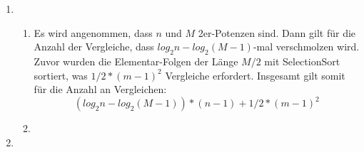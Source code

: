 \documentclass[a4paper,10pt]{scrartcl}
\begin{document}
\begin{enumerate}
\begin{description}
      \end{description}
\item \begin{enumerate}
       \item Es wird angenommen, dass $n$ und $M$ 2er-Potenzen sind.
	     Dann gilt für die Anzahl der Vergleiche, dass $log_2 n - log_2 (M - 1)$-mal verschmolzen wird. Zuvor wurden die Elementar-Folgen der Länge $M/2$ mit SelectionSort sortiert, was $1/2 * (m - 1)^2$ Vergleiche erfordert.
	     Insgesamt gilt somit für die Anzahl an Vergleichen:
	     \[
	      (log_2 n - log_2 (M-1)) * (n - 1) + 1/2 * (m - 1)^2
	     \]

       \item 
      \end{enumerate}
\item 
\end{enumerate}
\end{document}
